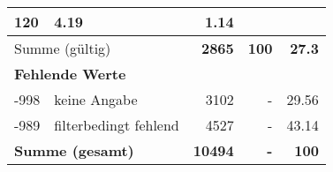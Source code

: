\begin{longtable}{lXrrr}
       \num{120} &
       \num[round-mode=places,round-precision=2]{4,19} &
         \num[round-mode=places,round-precision=2]{1,14} \\
     \midrule
     \multicolumn{2}{l}{Summe (gültig)} &
       \textbf{\num{2865}} &
     \textbf{100} &
       \textbf{\num[round-mode=places,round-precision=2]{27,3}} \\
     \multicolumn{5}{l}{\textbf{Fehlende Werte}}\\
       -998 &
       keine Angabe &
         \num{3102} &
        - &
         \num[round-mode=places,round-precision=2]{29,56} \\
       -989 &
       filterbedingt fehlend &
         \num{4527} &
        - &
         \num[round-mode=places,round-precision=2]{43,14} \\
     \midrule
     \multicolumn{2}{l}{\textbf{Summe (gesamt)}} &
          \textbf{\num{10494}} &
        \textbf{-} &
        \textbf{100} \\
     \bottomrule
     \end{longtable}
     
